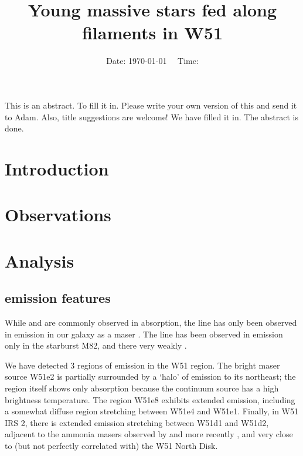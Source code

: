 



\title{Young massive stars fed along filaments in W51}


\date{Date: \today ~~ Time: \currenttime}

\abstract
{This is an abstract.}
{To fill it in.}
{Please write your own version of this and send it to Adam.
Also, title suggestions are welcome!}
{We have filled it in.}
{The abstract is done.}

\maketitle


\section{Introduction}
\section{Observations}
\section{Analysis}
\subsection{\formaldehyde emission features}
While \formaldehyde \oneone and \twotwo are commonly observed in absorption,
the \oneone line has only been observed in emission in our galaxy as a maser
\citep{Araya2007b}.  The \twotwo line has been observed in emission only  in the
starburst M82, and there very weakly \citep{Mangum2008a}.

We have detected 3 regions of \twotwo emission in the W51 region.  The bright
maser source W51e2 is partially surrounded by a `halo' of \formaldehyde \twotwo
emission to its northeast; the \hchii region itself shows only \twotwo
absorption because the continuum source has a high brightness temperature.  The
\hchii region W51e8 exhibits extended \twotwo emission, including a somewhat
diffuse region stretching between W51e4 and W51e1.  Finally, in W51 IRS 2,
there is extended \twotwo emission stretching between W51d1 and W51d2, adjacent
to the ammonia masers observed by \citet{Zhang1995a} and more recently
\citet{Goddi2015a}, and very close to (but not perfectly correlated with) the
\citet{Zapata2010a} W51 North Disk.

